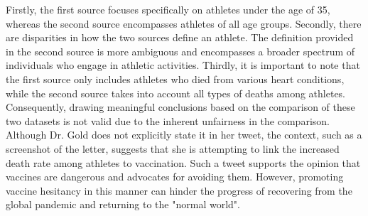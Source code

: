 \documentclass[fleqn,12pt]{article}
\begin{document}
Firstly, the first source focuses specifically on athletes under the age of 35, whereas the second source encompasses athletes of all age groups. 
Secondly, there are disparities in how the two sources define an athlete. The definition provided in the second source is more ambiguous and encompasses a 
broader spectrum of individuals who engage in athletic activities. Thirdly, it is important to note that the first source only includes athletes who died from 
various heart conditions, while the second source takes into account all types of deaths among athletes. 
Consequently, drawing meaningful conclusions based on the comparison of these two datasets is not valid due to the inherent unfairness in the comparison.
Although Dr. Gold does not explicitly state it in her tweet, the context, such as a screenshot of the letter, 
suggests that she is attempting to link the increased death rate among athletes to vaccination. 
Such a tweet supports the opinion that vaccines are dangerous and advocates for avoiding them. 
However, promoting vaccine hesitancy in this manner can hinder the progress of recovering from the global pandemic and returning to the "normal world".
\end{document}
